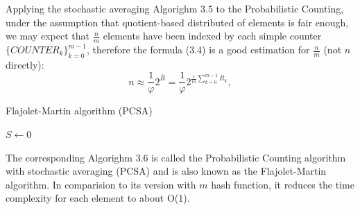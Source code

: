 \documentclass[a4paper,13pt]{article}
\theoremstyle{mytheor}
\begin{document}
Applying the stochastic averaging Algorighm 3.5 to the Probabilistic Counting,
under the assumption that quotient-based distributed of elements is fair enough,
we may expect that $\frac{n}{m}$ elements have been indexed
by each simple counter $\{COUNTER_k\}_{k=0}^{m-1}$, therefore the formula (3.4) is a
good estimation for $\frac{n}{m}$ (not $n$ directly):
\[n \approx \frac{1}{\varphi}2^{\bar{R}} = \frac{1}{\varphi}2^{\frac{1}{m}{\sum\limits_{k=0}^{m-1}R_k}},\]
\begin{algorithm}[H]
    \DontPrintSemicolon
    \LinesNumberedHidden
    \caption[]{Flajolet-Martin algorithm (PCSA)}
    $S \gets $0
\end{algorithm}
\vspace{0.25cm}
The corresponding Algorighm 3.6 is called the Probabilistic Counting
algorithm with stochastic averaging (PCSA) and is also known as
the Flajolet-Martin algorithm. In comparision to its version with $m$ hash
function, it reduces the time complexity for each element to about O(1).
\newpage
\end{document}
